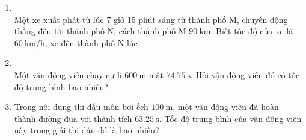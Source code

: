 \begin{enumerate}[label=\bfseries Câu \arabic*:,leftmargin=1.5cm]
\item {}\\
Một xe xuất phát từ lúc 7 giờ 15 phút sáng từ thành phố M, chuyển động thẳng đều tới thành phố N, cách thành phố M $\SI{90}{\kilo\meter}$. Biết tốc độ của xe là $\SI{60}{\kilo\meter/\hour}$, xe đến thành phố N lúc

\item {}\\
Một vận động viên chạy cự li $\SI{600}{\meter}$ mất $\SI{74.75}{\second}$. Hỏi vận động viên đó có tốc độ trung bình bao nhiêu?

\item Trong nội dung thi đấu môn bơi ếch $\SI{100}{\meter}$, một vận động viên đã hoàn thành đường đua với thành tích $\SI{63.25}{\second}$. Tốc độ trung bình của vận động viên này trong giải thi đấu đó là bao nhiêu?


\end{enumerate}
